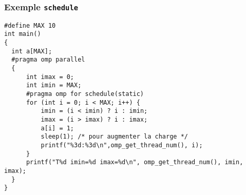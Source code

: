 \documentclass{beamer}
\begin{document}
\begin{frame}[fragile]
   \frametitle{Exemple {\tt schedule}}
   \small
  
\begin{verbatim}
#define MAX 10
int main()
{
  int a[MAX];
  #pragma omp parallel
  {
      int imax = 0;
      int imin = MAX;
      #pragma omp for schedule(static)
      for (int i = 0; i < MAX; i++) {
          imin = (i < imin) ? i : imin;
          imax = (i > imax) ? i : imax;
          a[i] = 1;
          sleep(1); /* pour augmenter la charge */
          printf("%3d:%3d\n",omp_get_thread_num(), i);
      }
      printf("T%d imin=%d imax=%d\n", omp_get_thread_num(), imin, imax);
  }
}
\end{verbatim}
\end{frame}
\end{document}

